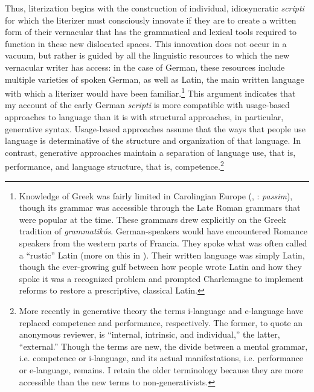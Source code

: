 \begin{sloppypar}
  Thus, literization begins with the construction of individual, idiosyncratic \textit{scripti} for which the literizer must consciously innovate if they are to create a written form of their vernacular that has the grammatical and lexical tools required to function in these new dislocated spaces. This innovation does not occur in a vacuum, but rather is guided by all the linguistic resources to which the new vernacular writer has access: in the case of German, these resources include multiple varieties of spoken German, as well as Latin, the main written language with which a literizer would have been familiar.\footnote{{Knowledge of Greek was fairly limited in Carolingian Europe (\citealt[7]{Persig2020}, \citealt{Dickey2016}:} {\textit{passim}}{), though its grammar was accessible through the Late Roman grammars that were popular at the time. These grammars drew explicitly on the Greek tradition of} {\textit{grammatikós}}{. German-speakers would have encountered Romance speakers from the western parts of Francia. They spoke what was often called a “rustic” Latin (more on this in ). Their written language was simply Latin, though the ever-growing gulf between how people wrote Latin and how they spoke it was a recognized problem and prompted Charlemagne to implement reforms to restore a prescriptive, classical Latin.}} This argument indicates that my account of the early German \textit{scripti} is more compatible with usage-based approaches to language than it is with structural approaches, in particular, generative syntax. Usage-based approaches assume that the ways that people use language is determinative of the structure and organization of that language. In contrast, generative approaches maintain a separation of language use, that is, performance, and language structure, that is, competence.\footnote{{More recently in generative theory the terms i-language and e-language have replaced competence and performance, respectively. The former, to quote an anonymous reviewer, is “internal, intrinsic, and individual,” the latter, “external.” Though the terms are new, the divide between a mental grammar, i.e. competence or i-language, and its actual manifestations, i.e. performance or e-language, remains. I retain the older terminology because they are more accessible than the new terms to non-generativists.}}
\end{sloppypar}


